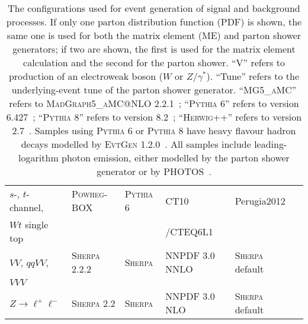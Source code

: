 \begin{table}
\begin{center}
{\begin{tabular}{llllll}
$s$-, $t$-channel, & \textsc{Powheg-BOX} \cite{powhegstp,powhegstp2} & \textsc{Pythia} 6 & CT10 & Perugia2012   \\
 $Wt$ single top & & & /CTEQ6L1 \\
$VV$, $qqVV$, & \textsc{Sherpa} 2.2.2 \cite{sherpa} & \textsc{Sherpa} & NNPDF 3.0 NNLO & \textsc{Sherpa} default  \\
$VVV$ & & & \\
$Z \to \ell^+\ell^-$ & \textsc{Sherpa} 2.2 & \textsc{Sherpa} & NNPDF 3.0 NLO & \textsc{Sherpa} default \\
\hline\hline
\end{tabular}
}
\caption{\label{tab:mcconfig} The configurations used for event generation of signal and background processes. 
If only one parton distribution function (PDF) is shown, the same one is used for both the matrix element (ME) and parton shower generators; 
if two are shown, the first is used for the matrix element calculation and the second for the parton shower.  ``V'' refers to production of 
an electroweak boson ($W$ or $Z/\gamma^*$).  ``Tune'' refers to the underlying-event tune of the parton shower generator. ``\textsc{MG5\_aMC}'' 
refers to \textsc{MadGraph5\_aMC@NLO} 2.2.1~\cite{Alwall:2014hca}; ``\textsc{Pythia} 6'' refers to version 6.427~\cite{Pythia6}; ``\textsc{Pythia} 8'' 
refers to version 8.2~\cite{Pythia8}; ``\textsc{Herwig++}'' refers to version 2.7~\cite{Bahr:2008pv}.  Samples using \textsc{Pythia} 6 or \textsc{Pythia} 8  
have heavy flavour hadron decays modelled by \textsc{EvtGen} 1.2.0~\cite{Lange:2001uf}.  All samples include leading-logarithm photon emission, either modelled 
by the parton shower generator or by \textsc{PHOTOS}~\cite{Golonka:2005pn}.}
\end{center}
\end{table}

